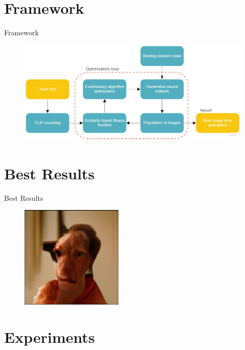\documentclass[t]{beamer}
\begin{document}
\section{Framework}

\begin{frame}{Framework}
\begin{figure}[ht!]
    \centering
    \includegraphics[scale=0.2]{framework.jpg}
\end{figure} 
\end{frame}

\section{Best Results}

\begin{frame}[c]{Best Results}
\begin{figure}[ht!]
    \centering
    \includegraphics[scale=0.8]{best.png}
\end{figure} 
\end{frame}

\section{Experiments}
\end{document}
